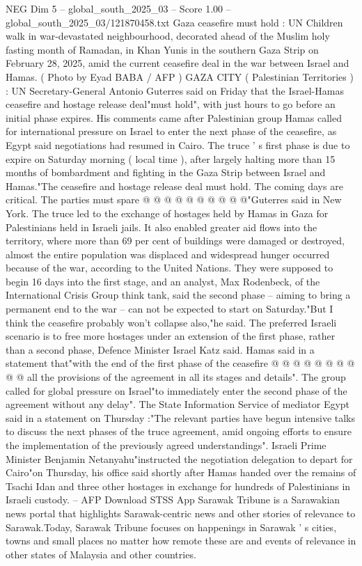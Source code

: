 \begin{textsample}{NEG Dim 5 – global\_south\_2025\_03 – Score 1.00 – global\_south\_2025\_03/121870458.txt}  \label{ex:f5_neg_265}
Gaza ceasefire must hold : UN Children walk in war-devastated neighbourhood, decorated ahead of the Muslim holy fasting month of Ramadan, in Khan Yunis in the southern Gaza Strip on February 28, 2025, amid the current ceasefire deal in the war between Israel and Hamas. ( Photo by Eyad BABA / AFP ) GAZA CITY ( Palestinian Territories ) : UN Secretary-General Antonio Guterres said on Friday that the Israel-Hamas ceasefire and hostage release deal"must hold", with just hours to go before an initial phase expires.
His comments came after Palestinian group Hamas called for international pressure on Israel to enter the next phase of the ceasefire, as Egypt said negotiations had resumed in Cairo.
The truce ' s first phase is due to expire on Saturday morning ( local time ), after largely halting more than 15 months of bombardment and fighting in the Gaza Strip between Israel and Hamas."The ceasefire and hostage release deal must hold.
The coming days are critical.
The parties must spare @ @ @ @ @ @ @ @ @ @"Guterres said in New York.
The truce led to the exchange of hostages held by Hamas in Gaza for Palestinians held in Israeli jails.
It also enabled greater aid flows into the territory, where more than 69 per cent of buildings were damaged or destroyed, almost the entire population was displaced and widespread hunger occurred because of the war, according to the United Nations.
They were supposed to begin 16 days into the first stage, and an analyst, Max Rodenbeck, of the International Crisis Group think tank, said the second phase -- aiming to bring a permanent end to the war -- can not be expected to start on Saturday."But I think the ceasefire probably won't collapse also,"he said.
The preferred Israeli scenario is to free more hostages under an extension of the first phase, rather than a second phase, Defence Minister Israel Katz said.
Hamas said in a statement that"with the end of the first phase of the ceasefire @ @ @ @ @ @ @ @ @ @ all the provisions of the agreement in all its stages and details".
The group called for global pressure on Israel"to immediately enter the second phase of the agreement without any delay".
The State Information Service of mediator Egypt said in a statement on Thursday :"The relevant parties have begun intensive talks to discuss the next phases of the truce agreement, amid ongoing efforts to ensure the implementation of the previously agreed understandings".
Israeli Prime Minister Benjamin Netanyahu"instructed the negotiation delegation to depart for Cairo"on Thursday, his office said shortly after Hamas handed over the remains of Tsachi Idan and three other hostages in exchange for hundreds of Palestinians in Israeli custody. -- AFP Download STSS App Sarawak Tribune is a Sarawakian news portal that highlights Sarawak-centric news and other stories of relevance to Sarawak.Today, Sarawak Tribune focuses on happenings in Sarawak ' s cities, towns and small places no matter how remote these are and events of relevance in other states of Malaysia and other countries.

\end{textsample}

